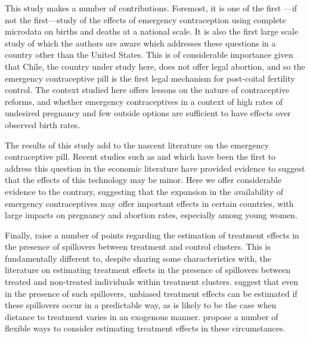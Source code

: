 This study makes a number of contributions.  Foremost, it is one of the first%
---if not the first---study of the effects of emergency contraception using 
complete microdata on births and deaths at a national scale. It is also the first 
large scale study of which the authors are aware which addresses these questions 
in a country other than the United States.  This is of considerable importance 
given that Chile, the country under study here, does not offer legal abortion, 
and so the emergency contraceptive pill is the first legal mechanism for 
post-coital fertility control.  The context studied here offers lessons on the 
nature of contraceptive reforms, and whether emergency contraceptives in a 
context of high rates of undesired pregnancy and few outside options are 
sufficient to have effects over observed birth rates.

The results of this study add to the nascent literature on the emergency 
contraceptive pill.  Recent studies such as \citet{Grossetal2014} and 
\citet{Durrance2013} which have been the first to address this question in 
the economic literature have provided evidence to suggest that the effects of 
this technology may be minor.  Here we offer considerable evidence to the 
contrary, suggesting that the expansion in the availability of emergency 
contraceptives may offer important effects in certain countries, with large 
impacts on pregnancy and abortion rates, especially among young women.

Finally, \person raise a number of points regarding the estimation of 
treatment effects in the presence of spillovers between treatment and control
clusters.  This is fundamentally different to, despite sharing some 
characteristics with, the literature on estimating treatment effects in the 
presence of spillovers between treated and non-treated individuals within 
treatment clusters.  \Person suggest that even in the presence of such 
spillovers, unbiased treatment effects can be estimated if these spillovers
occur in a predictable way, as is likely to be the case when distance to 
treatment varies in an exogenous manner. \Person propose a number of flexible
ways to consider estimating treatment effects in these circumstances.

  
